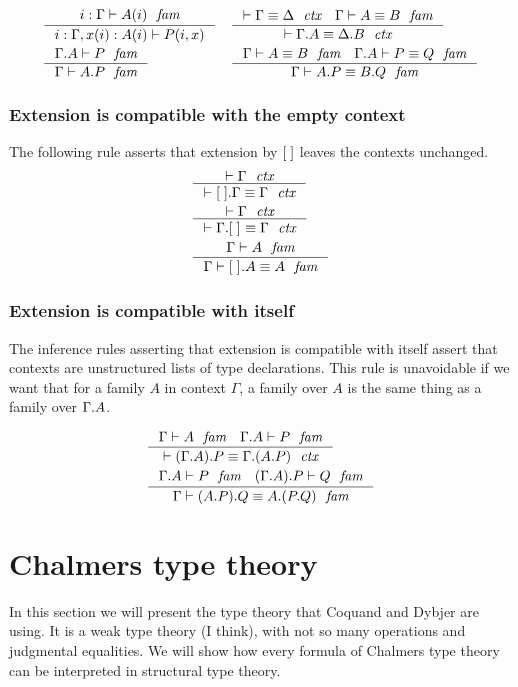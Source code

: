 \begin{align}
& \inference
  {\jvfam{i}{\Gamma}{A}}
  {\jvfamcombi{{i}{x}}{{\Gamma}{A}}{P}}
& & \inference
    {\jctxeq{\Gamma}{\Delta}
     \jfameq{\Gamma}{A}{B}}
    {\jctxeq{\ctxext{\Gamma}{A}}{\ctxext{\Delta}{B}}}\\
& \inference
  {\jfam{{\Gamma}{A}}{P}}
  {\jfam{\Gamma}{\ctxext{A}{P}}}
& & \inference
    {\jfameq{\Gamma}{A}{B}
     \jfameq{{\Gamma}{A}}{P}{Q}}
    {\jfameq{\Gamma}{\ctxext{A}{P}}{\ctxext{B}{Q}}}
\end{align}

\subsubsection{Extension is compatible with the empty context}
The following rule asserts that extension by ${[\;]}$ leaves the contexts unchanged.
\begin{align}
& \inference
  {\jctx{\Gamma}}
  {\jctxeq{\ctxext{\emptyc}{\Gamma}}{\Gamma}}\\
& \inference
  {\jctx{\Gamma}}
  {\jctxeq{\ctxext{\Gamma}{\emptyf}}{\Gamma}}\\
& \inference
  {\jfam{\Gamma}{A}}
  {\jfameq{\Gamma}{\ctxext{\emptyf}{A}}{A}}
\end{align}

\subsubsection{Extension is compatible with itself}
The inference rules asserting that extension is compatible with itself assert
that contexts are unstructured lists of type declarations. This rule is
unavoidable if we want that for a family $A$ in context $\Gamma$, a family over
$A$ is the same thing as a family over $\ctxext{\Gamma}{A}$. 

\begin{align}
& \inference
  {\jfam{\Gamma}{A}
   \jfam{{\Gamma}{A}}{P}}
  {\jctxeq{\ctxext{{\Gamma}{A}}{P}}{\ctxext{\Gamma}{{A}{P}}}}\\
& \inference
  {\jfam{{\Gamma}{A}}{P}
   \jfam{{{\Gamma}{A}}{P}}{Q}}
  {\jfameq{\Gamma}{\ctxext{{A}{P}}{Q}}{\ctxext{A}{{P}{Q}}}}
\end{align}


\section{Chalmers type theory}
In this section we will present the type theory that Coquand and Dybjer are using.
It is a weak type theory (I think), with not so many operations and judgmental equalities.
We will show how every formula of Chalmers type theory can be interpreted in
structural type theory.

